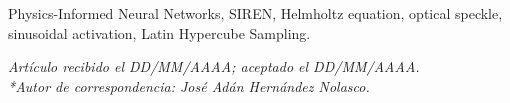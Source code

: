 \documentclass[spanish]{cys}
\begin{document}
\begin{keywords}
Physics-Informed Neural Networks, SIREN, Helmholtz equation, optical speckle,
sinusoidal activation, Latin Hypercube Sampling.
\end{keywords}







{


}

{\vskip 12pt}
\noindent
\footnotesize {\textit{Artículo recibido el DD/MM/AAAA; aceptado el DD/MM/AAAA.\\
{*}Autor de correspondencia: José Adán Hernández Nolasco.}}
\end{document}
